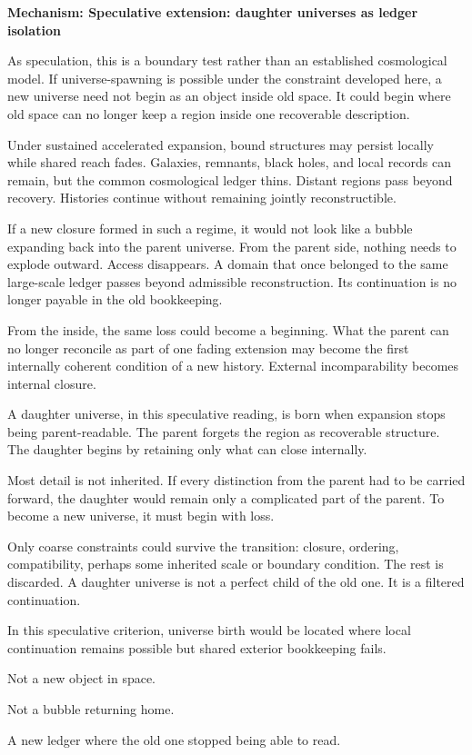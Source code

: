 \documentclass[11pt,twoside,openright]{book}
\newenvironment{mechanismbox}[1]
  {\begin{framed}\noindent\textbf{Mechanism: #1}\par\medskip}
  {\end{framed}}
\begin{document}
\begin{mechanismbox}{Speculative extension: daughter universes as ledger isolation}

As speculation, this is a boundary test rather than an established cosmological model. If universe-spawning is possible under the constraint developed here, a new universe need not begin as an object inside old space. It could begin where old space can no longer keep a region inside one recoverable description.

Under sustained accelerated expansion, bound structures may persist locally while shared reach fades. Galaxies, remnants, black holes, and local records can remain, but the common cosmological ledger thins. Distant regions pass beyond recovery. Histories continue without remaining jointly reconstructible.

If a new closure formed in such a regime, it would not look like a bubble expanding back into the parent universe. From the parent side, nothing needs to explode outward. Access disappears. A domain that once belonged to the same large-scale ledger passes beyond admissible reconstruction. Its continuation is no longer payable in the old bookkeeping.

From the inside, the same loss could become a beginning. What the parent can no longer reconcile as part of one fading extension may become the first internally coherent condition of a new history. External incomparability becomes internal closure.

A daughter universe, in this speculative reading, is born when expansion stops being parent-readable. The parent forgets the region as recoverable structure. The daughter begins by retaining only what can close internally.

Most detail is not inherited. If every distinction from the parent had to be carried forward, the daughter would remain only a complicated part of the parent. To become a new universe, it must begin with loss.

Only coarse constraints could survive the transition: closure, ordering, compatibility, perhaps some inherited scale or boundary condition. The rest is discarded. A daughter universe is not a perfect child of the old one. It is a filtered continuation.

In this speculative criterion, universe birth would be located where local continuation remains possible but shared exterior bookkeeping fails.

Not a new object in space.

Not a bubble returning home.

A new ledger where the old one stopped being able to read.
\end{mechanismbox}
\end{document}
